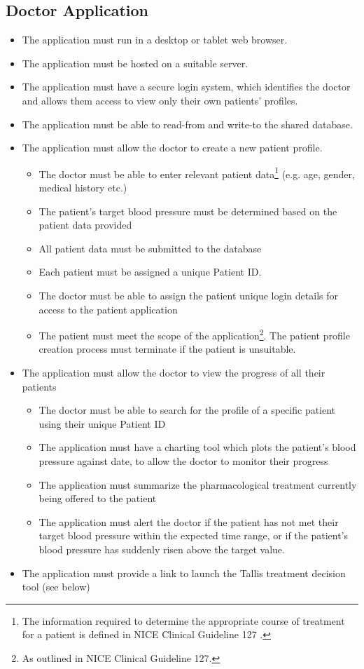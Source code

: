 \documentclass[11pt]{article}
\begin{document}
\subsection{Doctor Application}
\begin{itemize}
\item The application must run in a desktop or tablet web browser.
\item The application must be hosted on a suitable server.
\item The application must have a secure login system, which identifies the doctor and allows them access to view only their own patients' profiles.
\item The application must be able to read-from and write-to the shared database.
\item The application must allow the doctor to create a new patient profile.
	\begin{itemize}
    \item The doctor must be able to enter relevant patient data\footnote{The information required to determine the appropriate course of treatment for a patient is defined in NICE Clinical Guideline 127 \cite{CG127}.} (e.g. age, gender, medical history etc.)
    \item The patient's target blood pressure must be determined based on the patient data provided
    \item All patient data must be submitted to the database
    \item Each patient must be assigned a unique Patient ID.
    \item The doctor must be able to assign the patient unique login details for access to the patient application
    \item The patient must meet the scope of the application\footnote{As outlined in NICE Clinical Guideline 127\cite{CG127}.}. The patient profile creation process must terminate if the patient is unsuitable.
	\end{itemize}
\item The application must allow the doctor to view the progress of all their patients
	\begin{itemize}
    \item The doctor must be able to search for the profile of a specific patient using their unique Patient ID
    \item The application must have a charting tool which plots the patient's blood pressure against date, to allow the doctor to monitor their progress
    \item The application must summarize the pharmacological treatment currently being offered to the patient
    \item The application must alert the doctor if the patient has not met their target blood pressure within the expected time range, or if the patient's blood pressure has suddenly risen above the target value.
    \end{itemize}
\item The application must provide a link to launch the Tallis treatment decision tool (see below)
\end{itemize}
\end{document}
